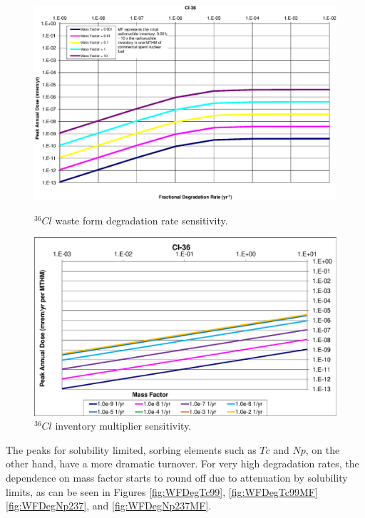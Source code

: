 \begin{figure}[ht]
\begin{minipage}[b]{0.45\linewidth}

\includegraphics[width=\linewidth]{./chapters/nuclide_sensitivity/clay/WFDegAndInv/Cl-36.eps}
\caption{$^{36}Cl$ waste form degradation rate sensitivity.}
\label{fig:WFDegCl36}

\end{minipage}
\hspace{0.05\linewidth}
\begin{minipage}[b]{0.45\linewidth}

\includegraphics[width=\linewidth]{./chapters/nuclide_sensitivity/clay/WFDegAndInv/Cl-36-MF.eps}
\caption{$^{36}Cl$ inventory multiplier sensitivity.}
\label{fig:WFDegCl36MF}
\end{minipage}
\end{figure}

The peaks for solubility limited, sorbing elements such as $Tc$ and $Np$, on the 
other hand, have a more dramatic turnover.  For very high degradation rates, the 
dependence on mass factor starts to round off due to attenuation by solubility 
limits, as can be seen in Figures \ref{fig:WFDegTc99}, \ref{fig:WFDegTc99MF} 
\ref{fig:WFDegNp237}, and \ref{fig:WFDegNp237MF}. 


